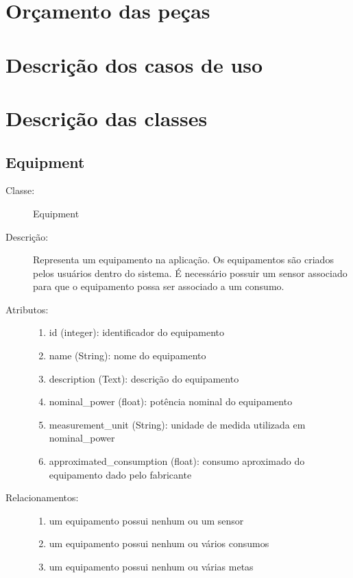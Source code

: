 \apendices
\chapter{Orçamento das peças}


\chapter{Descrição dos casos de uso}
\label{apendice_caso_uso}


\chapter{Descrição das classes}
\label{apendice_classes}
\section{Equipment}
\begin{description}
  \item[Classe:] Equipment
  \item[Descrição:] Representa um equipamento na aplicação. Os equipamentos são criados pelos usuários dentro do sistema. É necessário possuir um sensor associado para que o equipamento possa ser associado a um consumo.
  \item[Atributos:] \hfill
    \begin{enumerate}
      \item id (integer): identificador do equipamento
      \item name (String): nome do equipamento
      \item description (Text): descrição do equipamento 
      \item nominal\_power (float): potência nominal do equipamento 
      \item measurement\_unit (String): unidade de medida utilizada em nominal\_power
      \item approximated\_consumption (float): consumo aproximado do equipamento dado pelo fabricante 
    \end{enumerate}
  \item[Relacionamentos:] \hfill
    \begin{enumerate}
      \item um equipamento possui nenhum ou um sensor
      \item um equipamento possui nenhum ou vários consumos
      \item um equipamento possui nenhum ou várias metas
    \end{enumerate}
\end{description} 
%
